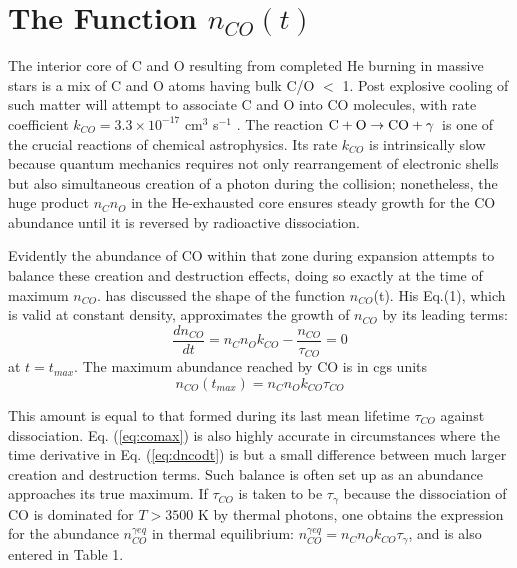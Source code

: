 \documentclass[manuscript]{aastex}
\newcommand{\cotoco}{${\rm C} + {\rm O} \to {\rm CO} + \gamma$}
\begin{document}
\section{The Function $n_{CO}(t)$}

The interior core of C and O resulting from completed He burning in massive
stars is a mix of C and O atoms having bulk C/O $<$ 1. Post explosive cooling of
such matter will attempt to associate C and O into CO molecules, with rate
coefficient $k_{CO} = 3.3 \times 10^{-17}$ cm$^3$ s$^{-1}$
\citep{1990ApJ...358..262L}.
The reaction \cotoco\ is one of the crucial reactions of chemical
astrophysics. Its rate $k_{CO}$ is intrinsically slow because quantum mechanics
requires not only rearrangement of electronic shells but also simultaneous
creation of a photon during the collision; nonetheless, the huge product
$n_C n_O$ in the He-exhausted core ensures steady growth for the CO abundance
until it is reversed by radioactive dissociation. 

Evidently the abundance of CO within that zone during expansion attempts to
balance these creation and destruction effects, doing so exactly at the
time of maximum $n_{CO}$. \citet{2013ApJ...762....5C}
has discussed the shape of the function
$n_{CO}$(t). His Eq.(1), which is valid at constant density,
approximates the growth of $n_{CO}$ by its leading terms:
\begin{equation}
\frac{dn_{CO}}{dt} = n_C n_O k_{CO} - \frac{n_{CO}}{\tau_{CO}} = 0
\label{eq:dncodt}
\end{equation}
at $t = t_{max}$.
The maximum abundance reached by CO is in cgs units
\begin{equation}
n_{CO}(t_{max}) = n_C n_O k_{CO} \tau_{CO} 
\label{eq:comax}
\end{equation}

This amount is equal to that formed during its last mean lifetime $\tau_{CO}$
against dissociation. Eq. (\ref{eq:comax}) is also highly accurate in
circumstances where the time derivative in Eq. (\ref{eq:dncodt}) is but a
small difference between much larger creation and destruction terms. Such
balance is often set up as an abundance approaches its true maximum. 
If $\tau_{CO}$ is taken to be $\tau_\gamma$ because
the dissociation of CO is dominated for $T > 3500$ K by thermal photons,
one obtains the expression for the abundance $n_{CO}^{\gamma eq}$ in thermal
equilibrium: $n_{CO}^{\gamma eq} = n_C n_O k_{CO} \tau_\gamma$,
and is also entered in Table 1. 
\end{document}
